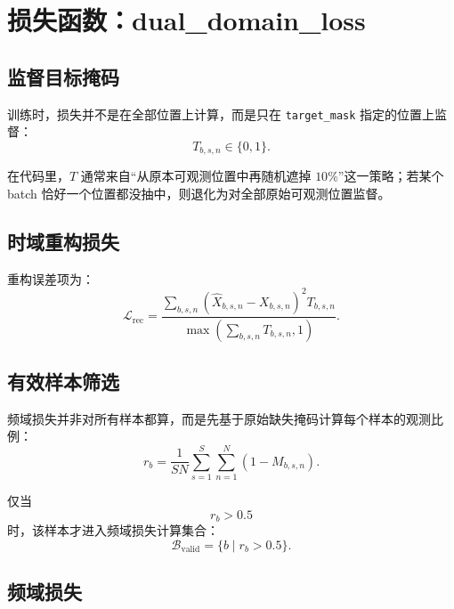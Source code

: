 \documentclass[UTF8]{ctexart}
\begin{document}
\section{损失函数：dual\_domain\_loss}

\subsection{监督目标掩码}

训练时，损失并不是在全部位置上计算，而是只在 \texttt{target\_mask} 指定的位置上监督：
\begin{equation}
    T_{b,s,n} \in \{0,1\}.
\end{equation}

在代码里，$T$ 通常来自“从原本可观测位置中再随机遮掉 $10\%$”这一策略；若某个 batch 恰好一个位置都没抽中，则退化为对全部原始可观测位置监督。

\subsection{时域重构损失}

重构误差项为：
\begin{equation}
    \mathcal{L}_{\text{rec}}
    =
    \frac{
        \sum_{b,s,n}
        \left(
            \hat{X}_{b,s,n} - X_{b,s,n}
        \right)^2
        T_{b,s,n}
    }{
        \max\!\left(\sum_{b,s,n}T_{b,s,n}, 1\right)
    }.
\end{equation}

\subsection{有效样本筛选}

频域损失并非对所有样本都算，而是先基于原始缺失掩码计算每个样本的观测比例：
\begin{equation}
    r_b = \frac{1}{SN}\sum_{s=1}^{S}\sum_{n=1}^{N}(1-M_{b,s,n}).
\end{equation}

仅当
\begin{equation}
    r_b > 0.5
\end{equation}
时，该样本才进入频域损失计算集合：
\begin{equation}
    \mathcal{B}_{\text{valid}} = \{b \mid r_b > 0.5\}.
\end{equation}

\subsection{频域损失}
\end{document}

